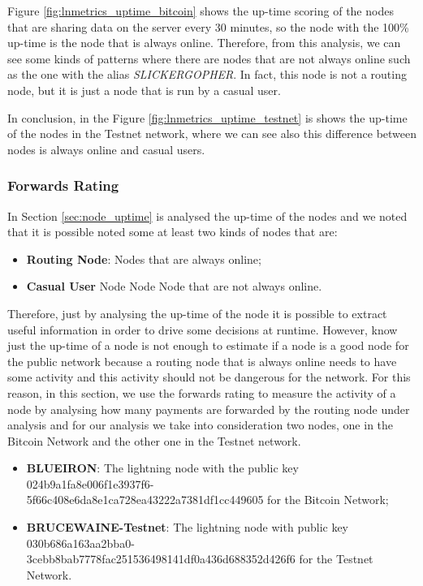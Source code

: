 Figure \ref{fig:lnmetrics_uptime_bitcoin} shows the up-time scoring of the nodes that 
are sharing data on the server every 30 minutes, so the node with the 100\% up-time 
is the node that is always online. Therefore, from this analysis, we can 
see some kinds of patterns where there are nodes that are not always online such as the one 
with the alias \emph{SLICKERGOPHER}. In fact, 
this node is not a routing node, but it is just a node that is run by a casual user.

In conclusion, in the Figure \ref{fig:lnmetrics_uptime_testnet} is
shows the up-time of the nodes in the Testnet network, where we can see also 
this difference between nodes is always online and casual users.

\subsubsection{Forwards Rating}

In Section \ref{sec:node_uptime} is analysed the up-time of the nodes and we 
noted that it is possible noted some at least two kinds of nodes that are: 

\begin{itemize}
    \item {\bf Routing Node}: Nodes that are always online;
    \item {\bf Casual User} Node Node Node that are not always online.
\end{itemize}

Therefore, just by analysing the up-time of the node it is possible to extract useful information 
in order to drive some decisions at runtime. However, know just the 
up-time of a node is not enough to estimate if a node is a good node for the public network 
because a routing node that is always online needs to have some activity and this activity 
should not be dangerous for the network.
For this reason, in this section, we use the forwards rating to measure the activity of a node 
by analysing how many payments are forwarded by the routing node under analysis and for our analysis 
we take into consideration two nodes, one in the Bitcoin Network and the other one in the Testnet network.

\begin{itemize}
    \item {\bf BLUEIRON}: The lightning node with the public key 024b9a1fa8e006f1e3937f6-\\5f66c408e6da8e1ca728ea43222a7381df1cc449605 for the Bitcoin Network;
    \item {\bf BRUCEWAINE-Testnet}: The lightning node with public key 030b686a163aa2bba0-\\3cebb8bab7778fac251536498141df0a436d688352d426f6 for the Testnet Network.
\end{itemize}

